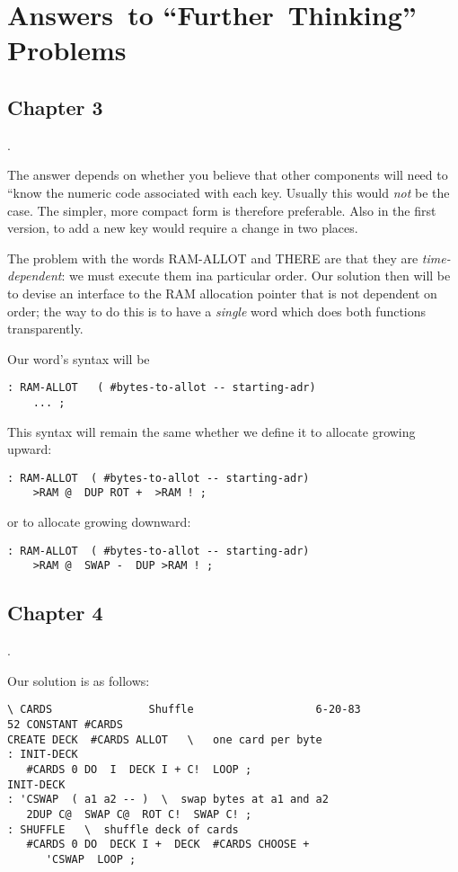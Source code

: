 \chapter{
Answers~to 
``Further~Thinking''
Problems}
\section{Chapter 3}
\begin{list}%
{.}{
    \setlength{\rightmargin}{\leftmargin}}
\item The answer depends on whether you believe that other components will
need to ``know the numeric code associated with each key.  Usually this
would \emph{not} be the case.  The simpler, more compact form is therefore
preferable.  Also in the first version, to add a new key would require a 
change in two places.
\item The problem with the words RAM-ALLOT and THERE are that they are 
\emph{time-dependent}:  we must execute them ina particular order.  Our solution
then will be to devise an interface to the RAM allocation pointer that is not
dependent on order; the way to do this is to have a \emph{single} word which does
both functions transparently.

Our word's syntax will be
\begin{verbatim}
: RAM-ALLOT   ( #bytes-to-allot -- starting-adr) 
    ... ;
\end{verbatim}
This syntax will remain the same whether we define it to allocate growing 
upward:
\begin{verbatim}
: RAM-ALLOT  ( #bytes-to-allot -- starting-adr)
    >RAM @  DUP ROT +  >RAM ! ;
\end{verbatim}
or to allocate growing downward:
\begin{verbatim}
: RAM-ALLOT  ( #bytes-to-allot -- starting-adr)
    >RAM @  SWAP -  DUP >RAM ! ;
\end{verbatim}
\end{list}

\section{Chapter 4}
\setcounter{exercise}{3}
\begin{list}%
{.}{
    \setlength{\rightmargin}{\leftmargin}}
\item Our solution is as follows:
\begin{verbatim}
\ CARDS               Shuffle                   6-20-83
52 CONSTANT #CARDS
CREATE DECK  #CARDS ALLOT   \   one card per byte
: INIT-DECK
   #CARDS 0 DO  I  DECK I + C!  LOOP ;
INIT-DECK
: 'CSWAP  ( a1 a2 -- )  \  swap bytes at a1 and a2
   2DUP C@  SWAP C@  ROT C!  SWAP C! ;
: SHUFFLE   \  shuffle deck of cards
   #CARDS 0 DO  DECK I +  DECK  #CARDS CHOOSE +
      'CSWAP  LOOP ;
\end{verbatim}
\end{list}
